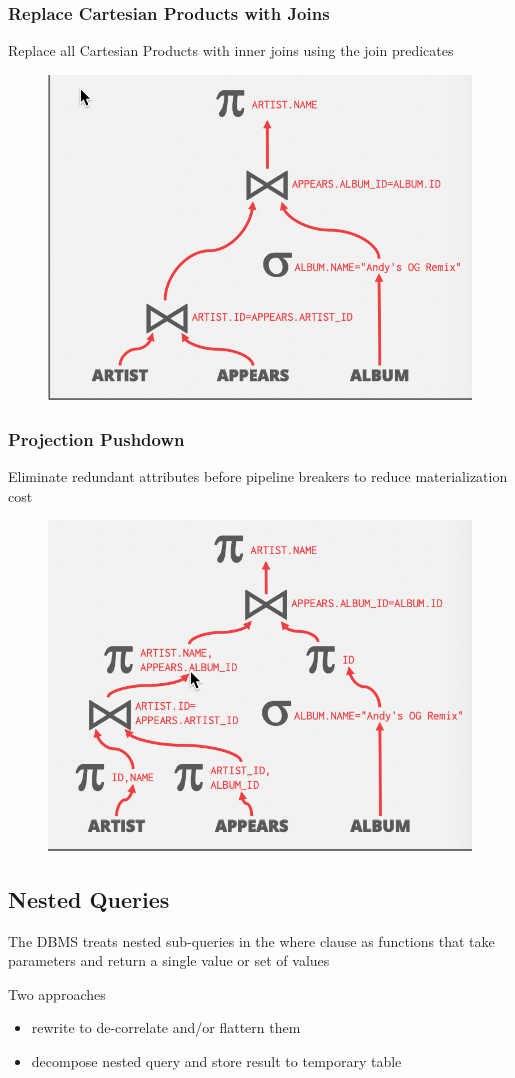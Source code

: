 \documentclass[11pt]{article}
\begin{document}
\subsubsection{Replace Cartesian Products with Joins}
\label{sec:orgb4c896d}
Replace all Cartesian Products with inner joins using the join predicates
\begin{figure}[htbp]
\centering
\includegraphics[width=.5\textwidth]{../images/15445/41.png}
\label{}
\end{figure}
\subsubsection{Projection Pushdown}
\label{sec:org70cdc83}
Eliminate redundant attributes before pipeline breakers to reduce materialization cost
\begin{figure}[htbp]
\centering
\includegraphics[width=.5\textwidth]{../images/15445/42.png}
\label{}
\end{figure}
\subsection{Nested Queries}
\label{sec:orgcf7cef1}
The DBMS treats nested sub-queries in the where clause as functions that take parameters and
return a single value or set of values

Two approaches
\begin{itemize}
\item rewrite to de-correlate and/or flattern them
\item decompose nested query and store result to temporary table
\end{itemize}
\end{document}
